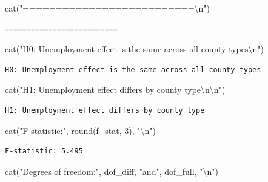 \documentclass[
  11pt,
]{article}
\newenvironment{Shaded}{\begin{snugshade}}{\end{snugshade}}
\newcommand{\DecValTok}[1]{\textcolor[rgb]{0.68,0.00,0.00}{#1}}
\newcommand{\FunctionTok}[1]{\textcolor[rgb]{0.28,0.35,0.67}{#1}}
\newcommand{\NormalTok}[1]{\textcolor[rgb]{0.00,0.23,0.31}{#1}}
\newcommand{\SpecialCharTok}[1]{\textcolor[rgb]{0.37,0.37,0.37}{#1}}
\newcommand{\StringTok}[1]{\textcolor[rgb]{0.13,0.47,0.30}{#1}}
\begin{document}
\begin{Shaded}
\begin{Highlighting}[]
\FunctionTok{cat}\NormalTok{(}\StringTok{"==========================}\SpecialCharTok{\textbackslash{}n}\StringTok{"}\NormalTok{)}
\end{Highlighting}
\end{Shaded}

\begin{verbatim}
==========================
\end{verbatim}

\begin{Shaded}
\begin{Highlighting}[]
\FunctionTok{cat}\NormalTok{(}\StringTok{"H0: Unemployment effect is the same across all county types}\SpecialCharTok{\textbackslash{}n}\StringTok{"}\NormalTok{)}
\end{Highlighting}
\end{Shaded}

\begin{verbatim}
H0: Unemployment effect is the same across all county types
\end{verbatim}

\begin{Shaded}
\begin{Highlighting}[]
\FunctionTok{cat}\NormalTok{(}\StringTok{"H1: Unemployment effect differs by county type}\SpecialCharTok{\textbackslash{}n\textbackslash{}n}\StringTok{"}\NormalTok{)}
\end{Highlighting}
\end{Shaded}

\begin{verbatim}
H1: Unemployment effect differs by county type
\end{verbatim}

\begin{Shaded}
\begin{Highlighting}[]
\FunctionTok{cat}\NormalTok{(}\StringTok{"F{-}statistic:"}\NormalTok{, }\FunctionTok{round}\NormalTok{(f\_stat, }\DecValTok{3}\NormalTok{), }\StringTok{"}\SpecialCharTok{\textbackslash{}n}\StringTok{"}\NormalTok{)}
\end{Highlighting}
\end{Shaded}

\begin{verbatim}
F-statistic: 5.495 
\end{verbatim}

\begin{Shaded}
\begin{Highlighting}[]
\FunctionTok{cat}\NormalTok{(}\StringTok{"Degrees of freedom:"}\NormalTok{, dof\_diff, }\StringTok{"and"}\NormalTok{, dof\_full, }\StringTok{"}\SpecialCharTok{\textbackslash{}n}\StringTok{"}\NormalTok{)}
\end{Highlighting}
\end{Shaded}
\end{document}
